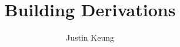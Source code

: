 \documentclass[a4paper, twoside]{report}
\title{Building Derivations}
\author{Justin Keung}
\begin{document}




\tableofcontents
\listoffigures
\listoftables



% 
% 


% 
% 

\DeclareRobustCommand{\VAN}[3]{#3}
\printbibliography
\end{document}
